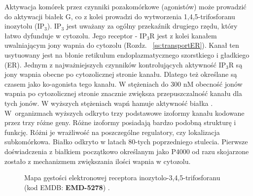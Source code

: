 Aktywacja komórek przez czynniki pozakomórkowe (agonistów) może prowadzić do aktywacji białek G, co z kolei  prowadzi do wytworzenia 1,4,5-trifosforanu inozytolu (IP$_3$). IP$_3$ jest uważany za ogólny przekaźnik drugiego rzędu, który łatwo dyfunduje w cytozolu. Jego receptor - IP$_3$R jest z kolei kanałem uwalniającym jony wapnia do cytozolu (Rozdz. ~\ref{ss:transportER}). Kanał ten usytuowany jest na błonie retikulum endoplazmatycznego szorstkiego i gładkiego (ER). Jednym z najważniejszych czynników kontrolujących aktywność IP$_3$R są jony wapnia obecne po cytozolicznej stronie kanału. Dlatego też określane są czasem jako ko-agonista tego kanału. W stężeniach do 300 nM obecność jonów wapnia po cytozolicznej stronie znacznie zwiększa przepuszczalność kanału dla tych jonów. W wyższych stężeniach wapń hamuje aktywność białka \cite{Parys2012}. W~organizmach wyższych odkryto trzy podstawowe izoformy kanału kodowane przez trzy różne geny. Różne izoformy posiadają bardzo podobną strukturę i funkcję. Różni je wrażliwość na poszczególne regulatory, czy lokalizacja subkomórkowa. Białko odkryto w latach 80-tych poprzedniego stulecia. Pierwsze doświadczenia z białkiem początkowo określanym jako P4000 od razu skojarzone zostało z mechanizmem zwiększania ilości wapnia w cytozolu. 

\begin{figure}[h]
	 \begin{center}
	 \end{center}
	\centering
	\caption[Mapa gęstości elektronowej receptora IP$_3$R]{Mapa gęstości elektronowej receptora inozytolo-3,4,5-trifosforanu (kod EMDB: \textbf{EMD-5278}) \cite{Seo2012}.}
	\label{fig:IP3Rcryo}
\end{figure}


